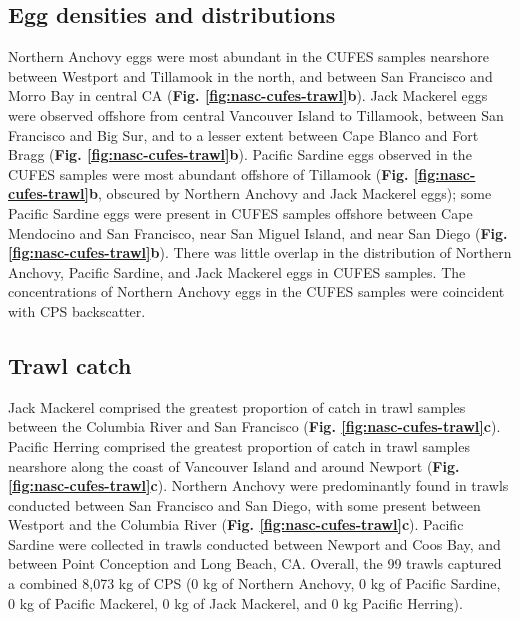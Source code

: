 \documentclass[]{article}
\begin{document}
\hypertarget{results-cufes-density}{%
\subsection{Egg densities and distributions}\label{results-cufes-density}}

Northern Anchovy eggs were most abundant in the CUFES samples nearshore between Westport and Tillamook in the north, and between San Francisco and Morro Bay in central CA (\textbf{Fig. \ref{fig:nasc-cufes-trawl}b}). Jack Mackerel eggs were observed offshore from central Vancouver Island to Tillamook, between San Francisco and Big Sur, and to a lesser extent between Cape Blanco and Fort Bragg (\textbf{Fig. \ref{fig:nasc-cufes-trawl}b}). Pacific Sardine eggs observed in the CUFES samples were most abundant offshore of Tillamook (\textbf{Fig. \ref{fig:nasc-cufes-trawl}b}, obscured by Northern Anchovy and Jack Mackerel eggs); some Pacific Sardine eggs were present in CUFES samples offshore between Cape Mendocino and San Francisco, near San Miguel Island, and near San Diego (\textbf{Fig. \ref{fig:nasc-cufes-trawl}b}). There was little overlap in the distribution of Northern Anchovy, Pacific Sardine, and Jack Mackerel eggs in CUFES samples. The concentrations of Northern Anchovy eggs in the CUFES samples were coincident with CPS backscatter.

\hypertarget{results-trawl-catch}{%
\subsection{Trawl catch}\label{results-trawl-catch}}

Jack Mackerel comprised the greatest proportion of catch in trawl samples between the Columbia River and San Francisco (\textbf{Fig. \ref{fig:nasc-cufes-trawl}c}). Pacific Herring comprised the greatest proportion of catch in trawl samples nearshore along the coast of Vancouver Island and around Newport (\textbf{Fig. \ref{fig:nasc-cufes-trawl}c}). Northern Anchovy were predominantly found in trawls conducted between San Francisco and San Diego, with some present between Westport and the Columbia River (\textbf{Fig. \ref{fig:nasc-cufes-trawl}c}). Pacific Sardine were collected in trawls conducted between Newport and Coos Bay, and between Point Conception and Long Beach, CA. Overall, the 99 trawls captured a combined 8,073 kg of CPS (0 kg of Northern Anchovy, 0 kg of Pacific Sardine, 0 kg of Pacific Mackerel, 0 kg of Jack Mackerel, and 0 kg Pacific Herring).
\end{document}
